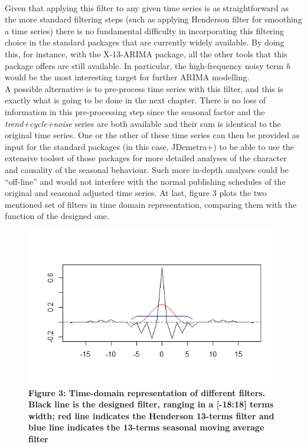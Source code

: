\documentclass{article}
\begin{document}
\\Given that applying this filter to any given time series is as straightforward as the more standard filtering steps (such as applying Henderson filter for smoothing a time series) there is no fundamental difficulty in incorporating this filtering choice in the standard packages that are currently widely available. By doing this, for instance, with the X-13-ARIMA package, all the other tools that this package offers are still available. In particular, the high-frequency noisy term \textit{h} would be the most interesting target for further ARIMA modelling. \\A possible alternative is to pre-process time series with this filter, and this is exactly what is going to be done in the next chapter. There is no loss of information in this pre-processing step since the seasonal factor and the \textit{trend+cycle+noise} series are both available and their sum is identical to the original time series. One or the other of these time series can then be provided as input for the standard packages (in this case, JDemetra+) to be able to use the extensive toolset of those packages for more detailed analyses of the character and causality of the seasonal behaviour. Such more in-depth analyses could be ``off-line'' and would not interfere with the normal publishing schedules of the original and seasonal adjusted time series.
At last, figure 3 plots the two mentioned set of filters in time domain representation, comparing them with the function of the designed one.
 \begin{figure}[H]
  \includegraphics[width=\linewidth]{../images/capitolo2/henderson_designed_ma.jpeg}
  {\textbf{\scriptsize Figure 3: Time-domain representation of different filters. Black line is the designed filter, ranging in a [-18:18] terms width; red line indicates the Henderson 13-terms filter and blue line indicates the 13-terms seasonal moving average filter}}
\end{figure}
\end{document}

